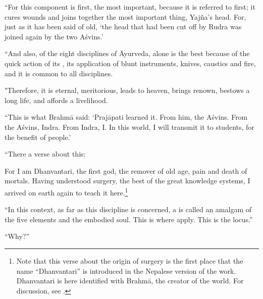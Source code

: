 \begin{translation}
    \item[17] 
    
“For this component is first, the most important, because it is
referred to first; it cures wounds and joins together the most
important thing, Yajña's head. For, just as it has been said of old,
`the head that had been cut off by Rudra was joined again by the two
Aśvins.'
    
    \item[18] 
    
    “And also, of the eight disciplines of Āyurveda, alone is the best
because of the quick action of its , its
application of blunt instruments, knives, caustics and fire, and
it is common to all disciplines.
    
    \item[19] 
    
"Therefore, it is eternal, meritorious, leads to heaven,
brings renown, bestows a long life, and affords a livelihood.
    
    \item[20] 
    
“This is what Brahmā said: `Prajāpati learned it. From him, the
Aśvins. From the Aśvins, Indra. From Indra, I. In this world, I will
transmit it to students, for the benefit of people.'
    
  \item[21]   
  
“There a verse about this:   
    \begin{sloka}
        For I am Dhanvantari, the first god, the remover of old age,
pain and death of mortals. Having understood surgery, the
best of the great knowledge systems, I arrived on earth again
to teach it here.\footnote{Note that this verse about the
    origin of surgery is the first place that the name
    “Dhanvantari” is introduced in the Nepalese version of the
    work. Dhanvantari is here identified with Brahmā, the creator
    of the world. For discussion, see \cite{birc-2021}.}
    \end{sloka}    
    
    
    \item[22] 
    
“In this context, as far as this discipline is concerned, a
 is called an amalgam of the five elements
and the embodied soul.  This is where  apply.
This is the locus.”
    
“Why?”
    

\end{translation}
